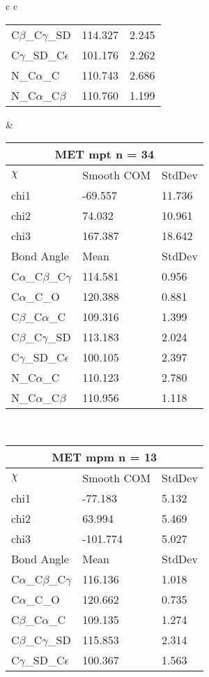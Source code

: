 \begin{longtable}{ c c }
\begin{tabular}{ l l l }
  C$\beta$\_C$\gamma$\_SD & 114.327 & 2.245\\
  C$\gamma$\_SD\_C$\epsilon$ & 101.176 & 2.262\\
  N\_C$\alpha$\_C & 110.743 & 2.686\\
  N\_C$\alpha$\_C$\beta$ & 110.760 & 1.199\\
  \bottomrule
  \end{tabular}
  &
  \begin{tabular}{ l l l }
  \toprule
  \multicolumn{3}{c}{MET \textbf{mpt} n = 34} \\ \toprule
  $\chi$       & Smooth COM & StdDev \\ \midrule
  chi1 & -69.557 & 11.736 \\ 
  chi2 & 74.032 & 10.961 \\ 
  chi3 & 167.387 & 18.642 \\ \midrule
  Bond Angle   & Mean     & StdDev \\ \midrule
  C$\alpha$\_C$\beta$\_C$\gamma$ & 114.581 & 0.956\\
  C$\alpha$\_C\_O & 120.388 & 0.881\\
  C$\beta$\_C$\alpha$\_C & 109.316 & 1.399\\
  C$\beta$\_C$\gamma$\_SD & 113.183 & 2.024\\
  C$\gamma$\_SD\_C$\epsilon$ & 100.105 & 2.397\\
  N\_C$\alpha$\_C & 110.123 & 2.780\\
  N\_C$\alpha$\_C$\beta$ & 110.956 & 1.118\\
  \bottomrule
  \end{tabular}
  \\
  \begin{tabular}{ l l l }
  \toprule
  \multicolumn{3}{c}{MET \textbf{mpm} n = 13} \\ \toprule
  $\chi$       & Smooth COM & StdDev \\ \midrule
  chi1 & -77.183 & 5.132 \\ 
  chi2 & 63.994 & 5.469 \\ 
  chi3 & -101.774 & 5.027 \\ \midrule
  Bond Angle   & Mean     & StdDev \\ \midrule
  C$\alpha$\_C$\beta$\_C$\gamma$ & 116.136 & 1.018\\
  C$\alpha$\_C\_O & 120.662 & 0.735\\
  C$\beta$\_C$\alpha$\_C & 109.135 & 1.274\\
  C$\beta$\_C$\gamma$\_SD & 115.853 & 2.314\\
  C$\gamma$\_SD\_C$\epsilon$ & 100.367 & 1.563\\

\end{tabular}
\end{longtable}
